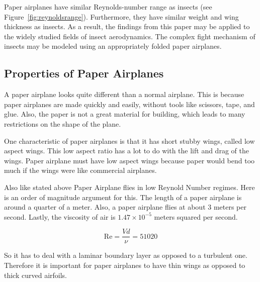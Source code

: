 Paper airplanes have similar Reynolds-number range as insects (see Figure~\ref{fig:reynoldsrange}). Furthermore, they have similar weight and wing thickness as
insects. As a result, the findings from this paper may be applied to the widely studied fields of insect aerodynamics. The complex fight mechanism of insects may
be modeled using an appropriately folded paper airplanes.

\subsection{Properties of Paper Airplanes}

A paper airplane looks quite different than a normal airplane. This is because
paper airplanes are made quickly and easily, without tools like scissors, tape,
and glue. Also, the paper is not a great material for building, which leads to many
restrictions on the shape of the plane.

One characteristic of paper airplanes is that it has short stubby
wings, called low aspect wings. This low aspect ratio has a lot to do with the
lift and drag of the wings. Paper airplane must have low aspect wings because
paper would bend too much if the wings were like commercial airplanes.

Also like stated above Paper Airplane flies in low Reynold Number regimes.
Here is an order of magnitude argument for this. The length of a paper airplane
is around a quarter of a meter. Also, a paper airplane flies at about 3 meters
per second. Lastly, the viscosity of air is $1.47 \times 10^{-5}$ meters squared per
second.

\[\text{Re} = \frac{Vd}{\nu} = 51020 \]


So it has to deal with a laminar boundary layer as opposed to a turbulent one.
Therefore it is important for paper airplanes to have thin wings as opposed to
thick curved airfoils.


